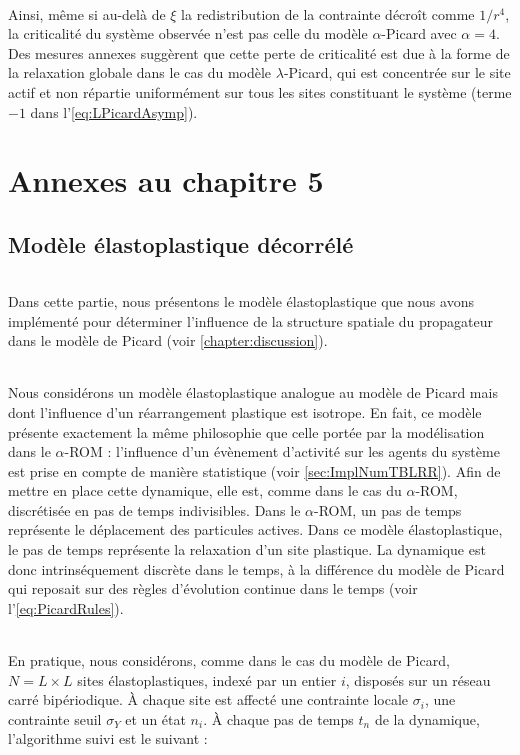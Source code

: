 \subparagraph{}Ainsi, même si au-delà de $\xi$ la redistribution de la contrainte décroît comme $1/r^4$, la criticalité du système observée n'est pas celle du modèle $\alpha$-Picard avec $\alpha = 4$. Des mesures annexes suggèrent que cette perte de criticalité est due à la forme de la relaxation globale dans le cas du modèle $\lambda$-Picard, qui est concentrée sur le site actif et non répartie uniformément sur tous les sites constituant le système (terme $-1$ dans l'\autoref{eq:LPicardAsymp}).

\resumetocwriting

\chapter{Annexes au chapitre 5}

\section{Modèle élastoplastique décorrélé}

\label{sec:EPMdiscret}

\subparagraph{}Dans cette partie, nous présentons le modèle élastoplastique que nous avons implémenté pour déterminer l'influence de la structure spatiale du propagateur dans le modèle de Picard (voir \autoref{chapter:discussion}).

\subparagraph{}Nous considérons un modèle élastoplastique analogue au modèle de Picard mais dont l'influence d'un réarrangement plastique est isotrope. En fait, ce modèle présente exactement la même philosophie que celle portée par la modélisation dans le $\alpha$-ROM : l'influence d'un évènement d'activité sur les agents du système est prise en compte de manière statistique (voir \autoref{sec:ImplNumTBLRR}). Afin de mettre en place cette dynamique, elle est, comme dans le cas du $\alpha$-ROM, discrétisée en pas de temps indivisibles. Dans le $\alpha$-ROM, un pas de temps représente le déplacement des particules actives. Dans ce modèle élastoplastique, le pas de temps représente la relaxation d'un site plastique. La dynamique est donc intrinséquement discrète dans le temps, à la différence du modèle de Picard qui reposait sur des règles d'évolution continue dans le temps (voir l'\autoref{eq:PicardRules}).

\subparagraph{}En pratique, nous considérons, comme dans le cas du modèle de Picard, $N = L\times L$ sites élastoplastiques, indexé par un entier $i$, disposés sur un réseau carré bipériodique. \`A chaque site est affecté une contrainte locale $\sigma_i$, une contrainte seuil $\sigma_Y$ et un état $n_i$. \`A chaque pas de temps $t_n$ de la dynamique, l'algorithme suivi est le suivant :

